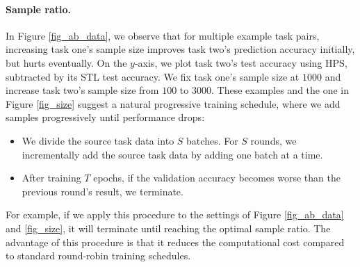 \paragraph{Sample ratio.}
In Figure \ref{fig_ab_data}, we observe that for multiple example task pairs, increasing task one's sample size improves task two's prediction accuracy initially, but hurts eventually.
On the $y$-axis, we plot task two's test accuracy using HPS, subtracted by its STL test accuracy.
We fix task one's sample size at $1000$ and increase task two's sample size from $100$ to $3000$. 
These examples and the one in Figure \ref{fig_size} suggest a natural progressive training schedule, where we add samples progressively until performance drops:
\begin{itemize}
	\item We divide the source task data into $S$ batches.
	For $S$ rounds, we incrementally add the source task data by adding one batch at a time.
	\item After training $T$ epochs, if the validation accuracy becomes worse than the previous round's result, we terminate.
\end{itemize}
For example, if we apply this procedure to the settings of Figure \ref{fig_ab_data} and \ref{fig_size}, it will terminate until reaching the optimal sample ratio.
The advantage of this procedure is that it reduces the computational cost compared to standard round-robin training schedules.


